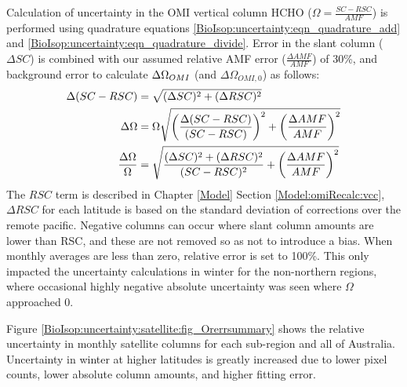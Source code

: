     
    Calculation of uncertainty in the OMI vertical column HCHO ($\Omega  = \frac{SC - RSC}{AMF}$) is performed using quadrature equations \ref{BioIsop:uncertainty:eqn_quadrature_add} and \ref{BioIsop:uncertainty:eqn_quadrature_divide}.
    Error in the slant column ($\Delta SC$) is combined with our assumed relative AMF error ($\frac{\Delta AMF}{AMF}$) of 30\%, and background error to calculate $\Delta \Omega_{OMI}$ (and $\Delta \Omega_{OMI,0}$) as follows:
    \begin{align}
      \Delta (SC-RSC) & = \sqrt{(\Delta SC)^2 + (\Delta RSC)^2} \notag \\
      \Delta \Omega   & = \Omega \sqrt{ \left( \frac{\Delta (SC-RSC)}{(SC-RSC)} \right)^2 + \left( \frac{\Delta AMF}{AMF} \right)^2 } \notag \\
      \frac{\Delta \Omega}{\Omega} & = \sqrt{ \frac{ (\Delta SC)^2 + (\Delta RSC)^2}{(SC-RSC)^2} + \left( \frac{\Delta AMF}{AMF} \right)^2 } \label{BioIsop:uncertainty:satellite:eqn_VCC_uncertainty} 
    \end{align}
    The $RSC$ term is described in Chapter \ref{Model} Section \ref{Model:omiRecalc:vcc}, $\Delta RSC$ for each latitude is based on the standard deviation of corrections over the remote pacific.
    Negative columns can occur where slant column amounts are lower than RSC, and these are not removed so as not to introduce a bias.
    When monthly averages are less than zero, relative error is set to 100\%.
    This only impacted the uncertainty calculations in winter for the non-northern regions, where occasional highly negative absolute uncertainty was seen where $\Omega$ approached 0.
    
    
    Figure \ref{BioIsop:uncertainty:satellite:fig_Orerrsummary} shows the relative uncertainty in monthly satellite columns for each sub-region and all of Australia.
    Uncertainty in winter at higher latitudes is greatly increased due to lower pixel counts, lower absolute column amounts, and higher fitting error.
    
    
